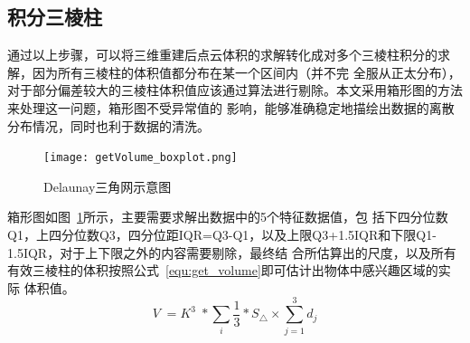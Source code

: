 \subsection{积分三棱柱}
\label{sec:4.4.4}
通过以上步骤，可以将三维重建后点云体积的求解转化成对多个三棱柱积分的求解，因为所有三棱柱的体积值都分布在某一个区间内（并不完
全服从正太分布），对于部分偏差较大的三棱柱体积值应该通过算法进行剔除。本文采用箱形图的方法来处理这一问题，箱形图不受异常值的
影响，能够准确稳定地描绘出数据的离散分布情况，同时也利于数据的清洗。
\begin{figure}[H] %
  \centering
  \texttt{[image: getVolume\_boxplot.png]}
  \caption{Delaunay三角网示意图}
  \label{fig:getVolume_boxplot}
\end{figure}
箱形图如图~\ref{fig:getVolume_boxplot}所示，主要需要求解出数据中的5个特征数据值，包
括下四分位数Q1，上四分位数Q3，四分位距IQR=Q3-Q1，以及上限Q3+1.5IQR和下限Q1-1.5IQR，对于上下限之外的内容需要剔除，最终结
合\label{sec:4.3}所估算出的尺度，以及所有有效三棱柱的体积按照公式~\ref{equ:get_volume}即可估计出物体中感兴趣区域的实际
体积值。
\begin{equation}
  V\;=K^3\;\ast\sum_i\frac13\ast S_\bigtriangleup\times\sum_{j=1}^3d_j\label{equ:get_volume}
\end{equation}




